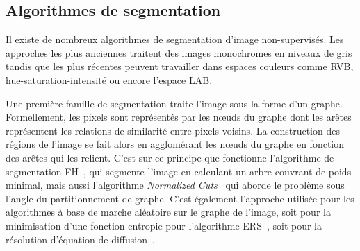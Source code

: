 \subsection{Algorithmes de segmentation}

Il existe de nombreux algorithmes de segmentation d'image non-supervisés. Les approches les plus anciennes traitent des images monochromes en niveaux de gris tandis que les plus récentes peuvent travailler dans espaces couleurs comme \gls{RVB}, hue-saturation-intensité ou encore l'espace \gls{LAB}.

Une première famille de segmentation traite l'image sous la forme d'un graphe. Formellement, les pixels sont représentés par les n\oe{}uds du graphe dont les arêtes représentent les relations de similarité entre pixels voisins. La construction des régions de l'image se fait alors en agglomérant les nœuds du graphe en fonction des arêtes qui les relient. C'est sur ce principe que fonctionne l'algorithme de segmentation \gls{FH}~\cite{felzenszwalb_efficient_2004}, qui segmente l'image en calculant un arbre couvrant de poids minimal, mais aussi l'algorithme \emph{Normalized Cuts}~\cite{shi_normalized_2000} qui aborde le problème sous l'angle du partitionnement de graphe. C'est également l'approche utilisée pour les algorithmes à base de marche aléatoire sur le graphe de l'image, soit pour la minimisation d'une fonction entropie pour l'algorithme \gls{ERS}~\cite{liu_entropy_2011}, soit pour la résolution d'équation de diffusion~\cite{grady_random_2006}.

